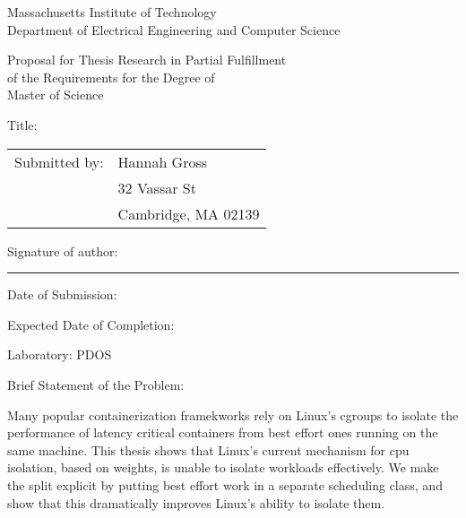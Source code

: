 
\begingroup
{}\large\selectfont


\begin{center}
Massachusetts Institute of Technology \\
Department of Electrical Engineering and Computer Science
\end{center}

\begin{center}
Proposal for Thesis Research in Partial Fulfillment \\
of the Requirements for the Degree of \\
Master of Science
\end{center}

\vspace{1em}
\noindent Title: \mytitle

\vspace{1em}
\noindent\begin{tabular}{@{}ll}
Submitted by: & Hannah Gross\\
              & 32 Vassar St \\
              & Cambridge, MA 02139
\end{tabular}

\vspace{1em}
\noindent Signature of author: \rule{5cm}{0.1pt}

\vspace{1em}
\noindent Date of Submission: \mydate

\vspace{1em}
\noindent Expected Date of Completion: \mycompletion

\vspace{1em}
\noindent Laboratory: PDOS

\vspace{1em}
\noindent Brief Statement of the Problem:

\vspace{1em}
\begin{minipage}{\dimexpr\textwidth-1cm}

\noindent Many popular containerization framekworks rely on Linux's cgroups to
isolate the performance of latency critical containers from best effort ones
running on the same machine. This thesis shows that Linux's current mechanism
for cpu isolation, based on weights, is unable to isolate workloads effectively.
We make the split explicit by putting best effort work in a separate scheduling
class, and show that this dramatically improves Linux's ability to isolate them.

\end{minipage}

